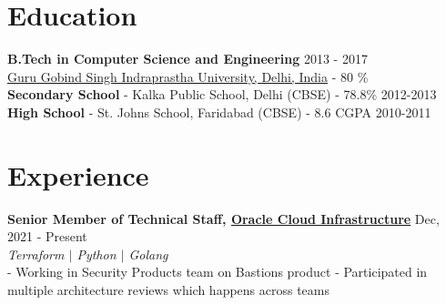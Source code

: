 \documentclass[margin, centered]{res}
\begin{document}
\begin{resume}

\section{Education}
\textbf{B.Tech in Computer Science and Engineering} \hfill 2013 - 2017 \textbf \\
\href{http://ipu.ac.in/}{Guru Gobind Singh Indraprastha University, Delhi, India} - {80 \%} \\ 
\textbf{Secondary School} - Kalka Public School, Delhi (CBSE) - 78.8\% \hfill 2012-2013\\
\textbf{High School} - St. Johns School, Faridabad (CBSE) - 8.6 CGPA \hfill 2010-2011
 
\section{Experience}
\textbf{Senior Member of Technical Staff, \href{https://www.oracle.com/cloud/}{Oracle Cloud Infrastructure}} \hfill Dec, 2021 - Present\\
\emph{\color{BlueViolet}Terraform $\vert$ Python $\vert$ Golang} \\
- Working in Security Products team on Bastions product
- Participated in multiple architecture reviews which happens across teams

\end{resume}
\end{document}
